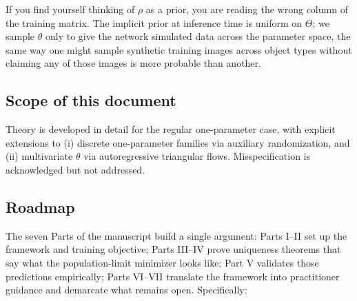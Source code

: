 \documentclass[11pt]{article}
\begin{document}
If you find yourself thinking of \(\rho\) as a prior, you are reading
the wrong column of the training matrix. The implicit prior at inference
time is uniform on \(\Theta\); we sample \(\theta\) only to give the
network simulated data across the parameter space, the same way one
might sample synthetic training images across object types without
claiming any of those images is more probable than another.

\subsection{Scope of this document}\label{subsec:1.4}

Theory is developed in detail for the regular one-parameter case, with
explicit extensions to (i) discrete one-parameter families via auxiliary
randomization, and (ii) multivariate \(\theta\) via autoregressive
triangular flows. Misspecification is acknowledged but not addressed.

\subsection{Roadmap}\label{subsec:1.5}

The seven Parts of the manuscript build a single argument: Parts I--II
set up the framework and training objective; Parts III--IV prove
uniqueness theorems that say what the population-limit minimizer looks
like; Part V validates those predictions empirically; Parts VI--VII
translate the framework into practitioner guidance and demarcate what
remains open. Specifically:
\end{document}
